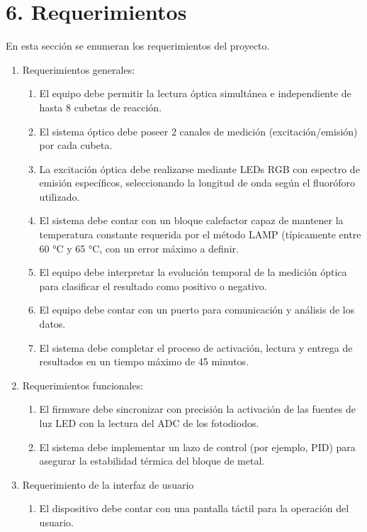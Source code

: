 \documentclass[
11pt, %
]{charter}
\begin{document}
\section{6. Requerimientos}
\label{sec:requerimientos}

En esta sección se enumeran los requerimientos del proyecto.

\begin{enumerate}
	\item Requerimientos generales:
		\begin{enumerate}
			\item El equipo debe permitir la lectura óptica simultánea e independiente de hasta 8 cubetas de reacción.
			\item El sistema óptico debe poseer 2 canales de medición (excitación/emisión) por cada cubeta.
			\item La excitación óptica debe realizarse mediante LEDs RGB con espectro de emisión específicos, seleccionando la longitud de onda según el fluoróforo utilizado.
			\item  El sistema debe contar con un bloque calefactor capaz de mantener la temperatura constante requerida por el método LAMP (típicamente entre 60 °C y 65 °C, con un error máximo a definir.
			\item El equipo debe interpretar la evolución temporal de la medición óptica para clasificar el resultado como positivo o negativo.
			\item El equipo debe contar con un puerto para comunicación y análisis de los datos.
			\item El sistema debe completar el proceso de activación, lectura y entrega de resultados en un tiempo máximo de 45 minutos.
		\end{enumerate}
	\item Requerimientos funcionales:
		\begin{enumerate}
			\item El firmware debe sincronizar con precisión la activación de las fuentes de luz LED con la lectura del ADC de los fotodiodos. 
			\item El sistema debe implementar un lazo de control (por ejemplo, PID) para asegurar la estabilidad térmica del bloque de metal.
		\end{enumerate}
	\item Requerimiento de la interfaz de usuario
	\begin{enumerate}
			\item El dispositivo debe contar con una pantalla táctil para la operación del usuario.

\end{enumerate}
\end{enumerate}
\end{document}

